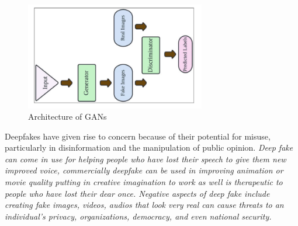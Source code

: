 \begin{figure}[h]
  \centering
  \includegraphics[width=0.7\textwidth]{images/GAN_architecture.PNG} 
  \caption{Architecture of GANs \cite{khanSystematicReviewDeepfake2023}}
  \label{fig:2}
\end{figure}
Deepfakes have given rise to concern because of their potential for misuse, particularly in disinformation and the manipulation of public opinion. \emph{Deep fake can come in use for helping people who have lost their speech to give them new improved voice, commercially deepfake can be used in improving animation or movie quality putting in creative imagination to work as well is therapeutic to people who have lost their dear once. Negative aspects of deep fake include creating fake images, videos, audios that look very real can cause threats to an individual’s privacy, organizations, democracy, and even national security.\cite{negiDeepFakeUnderstanding2021}}


